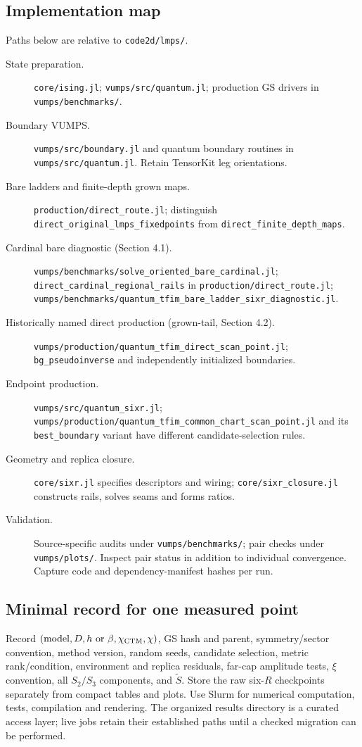 \documentclass[11pt]{article}
\newcommand{\tS}{\widetilde S}
\newcommand{\code}[1]{{\small\nolinkurl{#1}}}
\begin{document}
\subsection{Implementation map}
Paths below are relative to \code{code2d/lmps/}.
\begin{description}
\item[State preparation.] \code{core/ising.jl};
\code{vumps/src/quantum.jl}; production GS drivers in \code{vumps/benchmarks/}.
\item[Boundary VUMPS.] \code{vumps/src/boundary.jl} and quantum boundary routines
in \code{vumps/src/quantum.jl}. Retain TensorKit leg orientations.
\item[Bare ladders and finite-depth grown maps.]
\code{production/direct_route.jl}; distinguish
\code{direct_original_lmps_fixedpoints} from \code{direct_finite_depth_maps}.
\item[Cardinal bare diagnostic (Section 4.1).]
\code{vumps/benchmarks/solve_oriented_bare_cardinal.jl};
\code{direct_cardinal_regional_rails} in \code{production/direct_route.jl};
\code{vumps/benchmarks/quantum_tfim_bare_ladder_sixr_diagnostic.jl}.
\item[Historically named direct production (grown-tail, Section 4.2).]
\code{vumps/production/quantum_tfim_direct_scan_point.jl};
\code{bg_pseudoinverse} and independently initialized boundaries.
\item[Endpoint production.]
\code{vumps/src/quantum_sixr.jl};
\code{vumps/production/quantum_tfim_common_chart_scan_point.jl} and
its \code{best_boundary} variant have different candidate-selection rules.
\item[Geometry and replica closure.]
\code{core/sixr.jl} specifies descriptors and wiring;
\code{core/sixr_closure.jl} constructs rails, solves seams and forms ratios.
\item[Validation.] Source-specific audits under \code{vumps/benchmarks/};
pair checks under \code{vumps/plots/}. Inspect pair status in addition to
individual convergence. Capture code and dependency-manifest hashes per run.
\end{description}

\subsection{Minimal record for one measured point}
Record $(\mathrm{model},D,h\text{ or }\beta,\chi_{\rm CTM},\chi)$, GS hash and
parent, symmetry/sector convention, method version, random seeds, candidate
selection, metric rank/condition, environment and replica residuals, far-cap
amplitude tests, $\xi$ convention, all $S_2/S_3$ components, and $\tS$.
Store the raw six-$R$ checkpoints separately from compact tables and plots.
Use Slurm for numerical computation, tests, compilation and rendering.
The organized results directory is a curated access layer; live jobs retain
their established paths until a checked migration can be performed.
\fi
\end{document}
